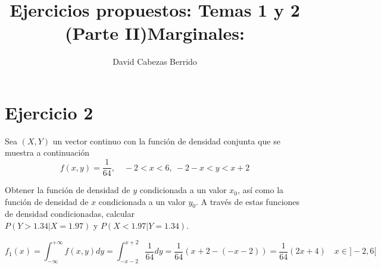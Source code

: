 \documentclass[tikz]{article}
\begin{document}
\title{Ejercicios propuestos: Temas 1 y 2 (Parte II)}
\author{David Cabezas Berrido}
\date{}
\maketitle

\section*{Ejercicio 2}

Sea $(X,Y)$ un vector continuo con la función de densidad conjunta que
se muestra a continuación
\[f(x,y)=\frac{1}{64}, \quad -2<x<6,\ -2-x<y<x+2\]

Obtener la función de densidad de $y$ condicionada a un valor $x_0$,
así como la función de densidad de $x$ condicionada a un valor
$y_0$. A través de estas funciones de densidad condicionadas, calcular
\\ $P(Y>1.34|X=1.97)$ y $P(X<1.97|Y=1.34)$.

\begin{center}
\end{center}

\vspace{2mm}

\title{\large \textbf{Marginales:}}

\[f_1(x) = \int_{-\infty}^{+\infty} f(x,y) dy =
\int_{-x-2}^{x+2}\frac{1}{64}dy=\frac{1}{64}(x+2-(-x-2))=\frac{1}{64}(2x+4)
\quad x \in ]-2,6[\]
\end{document}
